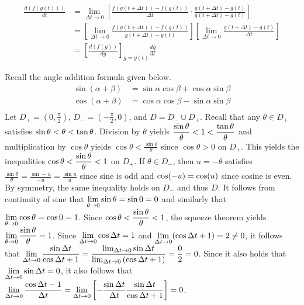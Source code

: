 \begin{answer}[Differentiation]
	\begin{align*}
		\frac{d\left(f(g(t))\right)}{dt}
		 & = \lim_{\Delta t \to 0} \left[ \frac{f\left(g(t+\Delta t)\right) - f\left(g(t)\right)}{\Delta t} \cdot \frac{g(t + \Delta t) - g(t)}{g(t + \Delta t) - g(t)} \right]                              \\
		 & = \left[\lim_{\Delta t \to 0} \frac{f\left(g(t+\Delta t)\right) - f\left(g(t)\right)}{g(t + \Delta t) - g(t)} \right] \left[\lim_{\Delta t \to 0 }\frac{g(t + \Delta t) - g(t)}{\Delta t} \right] \\
		 & = \left[\frac{d\left(f(g)\right)}{dg}\right]_{g=g(t)} \frac{dg}{dt}
	\end{align*}
\end{answer}

\begin{answer}[Trigonometry]
	Recall the angle addition formula given below.
	\begin{align}
		\sin\left(\alpha + \beta\right) & = \sin \alpha \cos \beta + \cos \alpha \sin \beta \\
		\cos\left(\alpha + \beta\right) & = \cos \alpha \cos \beta - \sin \alpha \sin \beta \\
	\end{align}
	Let $D_+ = \left(0, \frac{\pi}{2}\right)$, $D_- = \left(-\frac{\pi}{2}, 0\right)$, and $D = D_- \cup D_+$.
	Recall that any $\theta \in D_+$ satisfies $\displaystyle \sin \theta < \theta < \tan \theta$.
	Division by $\theta$ yields $\displaystyle \frac{\sin \theta}{\theta} < 1 < \frac{\tan \theta}{\theta}$ and multiplication by $\cos \theta$ yields $\cos \theta < \frac{\sin \theta}{\theta}$ since $\cos \theta > 0$ on $D_+$.
	This yields the inequalities $\displaystyle \cos \theta < \frac{\sin \theta}{\theta} < 1$ on $D_+$.
	If $\theta \in D_-$, then $u = - \theta$ satisfies $\frac{\sin \theta}{\theta} = \frac{\sin -u}{-u} = \frac{\sin u}{u}$ since sine is odd and $\cos\!\left(-u\right) = \cos\!\left(u\right)$ since cosine is even.
	By symmetry, the same inequality holds on $D_-$ and thus $D$.
	It follows from continuity of sine that $\displaystyle \lim_{\theta \to 0} \sin \theta = \sin 0 = 0$ and similarly that $\displaystyle \lim_{\theta \to 0} \cos \theta = \cos 0 = 1$.
	Since $\displaystyle \cos \theta < \frac{\sin \theta}{\theta} < 1$, the squeeze theorem yields $\displaystyle \lim_{\theta \to 0} \frac{\sin \theta}{\theta} = 1$.
	Since $\displaystyle \lim_{\Delta t \to 0} \cos \Delta t = 1$ and $\displaystyle \lim_{\Delta t \to 0} \!\left(\cos \Delta t+1\right) = 2 \neq 0$, it follows that $\displaystyle \lim_{\Delta t \to 0} \frac{\sin \Delta t}{\cos \Delta t + 1} = \frac{\lim_{\Delta t \to 0} \sin \Delta t}{\lim_{\Delta t \to 0} \left(\cos \Delta t + 1\right)} = \frac{0}{2} = 0$.
	Since it also holds that $\displaystyle \lim_{\Delta t \to 0} \sin \Delta t = 0$, it also follows that $\displaystyle \lim_{\Delta t \to 0} \frac{\cos \Delta t - 1}{\Delta t} = \lim_{\Delta t \to 0} \left[- \frac{\sin \Delta t}{\Delta t} \frac{\sin \Delta t}{\cos \Delta t + 1}\right] = 0$.


\end{answer}
